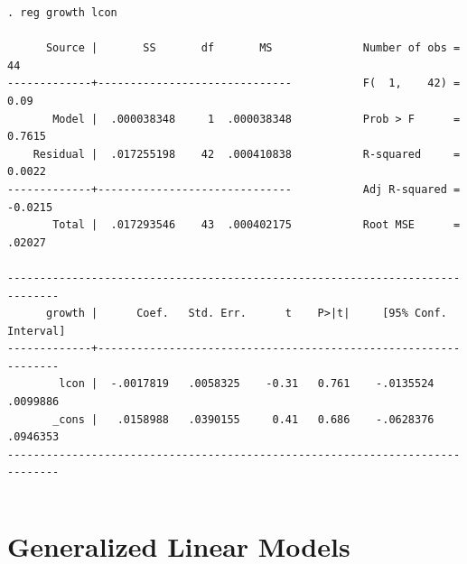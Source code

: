 
\begin{frame}[fragile,label=statareg]
\scriptsize
\begin{columns}
    \column{\dimexpr\paperwidth-20pt}
\begin{verbatim}
. reg growth lcon

      Source |       SS       df       MS              Number of obs =      44
-------------+------------------------------           F(  1,    42) =    0.09
       Model |  .000038348     1  .000038348           Prob > F      =  0.7615
    Residual |  .017255198    42  .000410838           R-squared     =  0.0022
-------------+------------------------------           Adj R-squared = -0.0215
       Total |  .017293546    43  .000402175           Root MSE      =  .02027

------------------------------------------------------------------------------
      growth |      Coef.   Std. Err.      t    P>|t|     [95% Conf. Interval]
-------------+----------------------------------------------------------------
        lcon |  -.0017819   .0058325    -0.31   0.761    -.0135524    .0099886
       _cons |   .0158988   .0390155     0.41   0.686    -.0628376    .0946353
------------------------------------------------------------------------------

\end{verbatim}
    
\end{columns}
\end{frame}



\section{Generalized Linear Models}
\frame{\tableofcontents[currentsection]}

